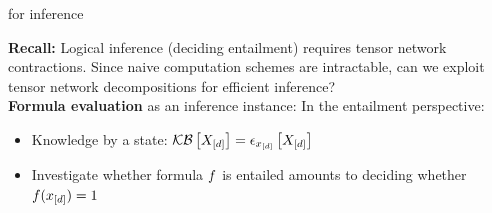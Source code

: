 \documentclass{beamer}
\begin{document}
    \begin{frame}{\DecompositionSparsity{} for inference}

        {\bf Recall:} Logical inference (deciding entailment) requires tensor network contractions.
        Since naive computation schemes are intractable, can we exploit tensor network decompositions for efficient inference?
        \medskip \\
        {\bf Formula evaluation} as an inference instance:
        In the entailment perspective:
        \begin{itemize}
            \item Knowledge by a state: $\mathcal{KB}\left[X_{[d]}\right]=\epsilon_{x_{[d]}}\left[X_{[d]}\right]$
            \item Investigate whether formula $f$ is entailed amounts to deciding whether $f(x_{[d]})=1$
        \end{itemize}


    \end{frame}
\end{document}
